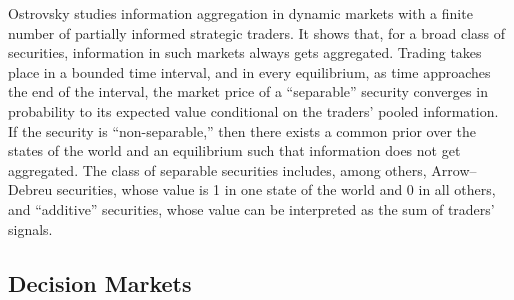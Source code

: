Ostrovsky studies information aggregation in dynamic markets with a finite number of partially informed strategic traders. It shows that, for a broad class of securities, information in such markets always gets aggregated. Trading takes place in a bounded time interval, and in every equilibrium, as time approaches the end of the interval, the market price of a “separable” security converges in probability to its expected value conditional on the traders’ pooled information. If the security is “non-separable,” then there exists a common prior over the states of the world and an equilibrium such that information does not get aggregated. The class of separable securities includes, among others, Arrow–Debreu securities, whose value is 1 in one state of the world and 0 in all others, and “additive” securities, whose value can be interpreted as the sum of traders’ signals.





\subsection{Decision Markets}


